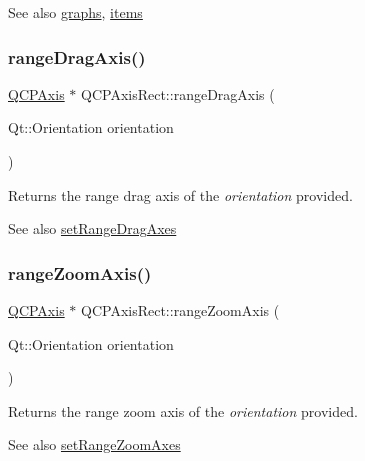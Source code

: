 \begin{DoxySeeAlso}{See also}
\mbox{\hyperlink{class_q_c_p_axis_rect_a2d9ded3eca97be1fcb5867949391bb88}{graphs}}, \mbox{\hyperlink{class_q_c_p_axis_rect_a03c113a2175448300ee8f944e24776ba}{items}} 
\end{DoxySeeAlso}
\mbox{\label{class_q_c_p_axis_rect_a6d7c22cfc54fac7a3d6ef80b133a8574}} 
\subsubsection{\texorpdfstring{range\+Drag\+Axis()}{rangeDragAxis()}}
{\footnotesize\ttfamily \mbox{\hyperlink{class_q_c_p_axis}{Q\+C\+P\+Axis}} $\ast$ Q\+C\+P\+Axis\+Rect\+::range\+Drag\+Axis (\begin{DoxyParamCaption}\item[{Qt\+::\+Orientation}]{orientation }\end{DoxyParamCaption})}

Returns the range drag axis of the {\itshape orientation} provided.

\begin{DoxySeeAlso}{See also}
\mbox{\hyperlink{class_q_c_p_axis_rect_a648cce336bd99daac4a5ca3e5743775d}{set\+Range\+Drag\+Axes}} 
\end{DoxySeeAlso}
\mbox{\label{class_q_c_p_axis_rect_a679c63f2b8daccfe6ec5110dce3dd3b6}} 
\subsubsection{\texorpdfstring{range\+Zoom\+Axis()}{rangeZoomAxis()}}
{\footnotesize\ttfamily \mbox{\hyperlink{class_q_c_p_axis}{Q\+C\+P\+Axis}} $\ast$ Q\+C\+P\+Axis\+Rect\+::range\+Zoom\+Axis (\begin{DoxyParamCaption}\item[{Qt\+::\+Orientation}]{orientation }\end{DoxyParamCaption})}

Returns the range zoom axis of the {\itshape orientation} provided.

\begin{DoxySeeAlso}{See also}
\mbox{\hyperlink{class_q_c_p_axis_rect_a9442cca2aa358405f39a64d51eca13d2}{set\+Range\+Zoom\+Axes}} 
\end{DoxySeeAlso}
\mbox{\label{class_q_c_p_axis_rect_ae4e6c4d143aacc88d2d3c56f117c2fe1}} 
